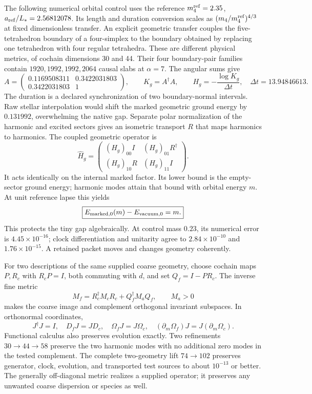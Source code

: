 \documentclass[11pt]{article}
\begin{document}
The following numerical orbital control uses the reference
$m_4^{\rm ref}=2.35$, $a_{\rm ref}/L_*=2.56812078$.
Its length and duration conversion scales as
$(m_4/m_4^{\rm ref})^{4/3}$ at fixed dimensionless transfer.
An explicit geometric transfer couples the five-tetrahedron
boundary of a four-simplex to the boundary obtained by replacing
one tetrahedron with four regular tetrahedra. These are different
physical metrics, of cochain dimensions 30 and 44.
Their four boundary-pair families contain
\(1920,1992,1992,2064\) causal slabs at \(\alpha=7\).
The angular sums give
\[
A=\begin{pmatrix}0.1169508311&0.3422031803\\
0.3422031803&1\end{pmatrix},\qquad
K_g=A^\dagger A,\qquad H_g=-\frac{\log K_g}{\Delta t},
\quad\Delta t=13.94846613.
\]
The duration is a declared synchronization of two boundary-normal
intervals. Raw stellar interpolation would shift the marked
geometric ground energy by \(0.131992\), overwhelming the
native gap. Separate polar normalization of the harmonic and
excited sectors gives an isometric transport \(R\) that maps
harmonics to harmonics. The coupled geometric operator is
\[
\widehat H_g=
\begin{pmatrix}
(H_g)_{00}I&(H_g)_{01}R^\dagger\\
(H_g)_{10}R&(H_g)_{11}I
\end{pmatrix}.
\]
It acts identically on the internal marked factor.
Its lower bound is the empty-sector ground energy; harmonic
modes attain that bound with orbital energy \(m\).
At unit reference lapse this yields
\[
\boxed{E_{{\rm marked},0}(m)-E_{{\rm vacuum},0}=m.}
\]
This protects the tiny gap algebraically. At control mass
\(0.23\), its numerical error is \(4.45\times10^{-16}\);
clock differentiation and unitarity agree to
\(2.84\times10^{-10}\) and \(1.76\times10^{-15}\).
A retained packet moves and changes geometry coherently.

For two descriptions of the same supplied coarse geometry,
choose cochain maps \(P,R_c\) with \(R_cP=I\), both commuting
with \(d\), and set \(Q_f=I-PR_c\).
The inverse fine metric
\[
\boxed{M_f=R_c^\dagger M_cR_c+Q_f^\dagger M_aQ_f,\qquad M_a>0}
\]
makes the coarse image and complement orthogonal invariant
subspaces. In orthonormal coordinates,
\[
J^\dagger J=I,\quad D_fJ=JD_c,\quad
\Omega_fJ=J\Omega_c,\quad
(\partial_m\Omega_f)J=J(\partial_m\Omega_c).
\]
Functional calculus also preserves evolution exactly.
Two refinements \(30\to44\to58\) preserve the two harmonic
modes with no additional zero modes in the tested complement.
The complete two-geometry lift \(74\to102\) preserves generator,
clock, evolution, and transported test sources to about
\(10^{-13}\) or better. The generally off-diagonal metric
realizes a supplied operator; it preserves any unwanted coarse
dispersion or species as well.
\end{document}
